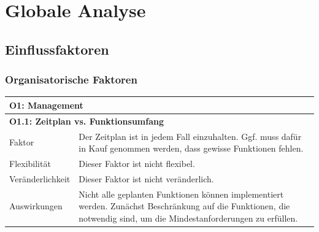 \documentclass[fontsize=12pt,paper=a4,twoside]{scrartcl}
\begin{document}
\section{Globale Analyse}
\label{sec:globale_analyse}

\subsection{Einflussfaktoren}
\label{sec:einflussfaktoren}

\subsubsection{Organisatorische Faktoren}
\begin{tabularx}{\textwidth}{|l|X|}
\hline
\multicolumn{2}{|l|}{\textbf{O1: Management}}\\\hline
\multicolumn{2}{|l|}{\textbf{O1.1: Zeitplan vs. Funktionsumfang}}\\\hline
 Faktor & Der Zeitplan ist in jedem Fall einzuhalten. Ggf. muss dafür in Kauf genommen werden, dass gewisse Funktionen fehlen. \\\hline
 Flexibilität & Dieser Faktor ist nicht flexibel.\\\hline
 Veränderlichkeit & Dieser Faktor ist nicht veränderlich.\\\hline
 Auswirkungen & Nicht alle geplanten Funktionen können implementiert werden. Zunächst Beschränkung auf die Funktionen, die notwendig sind, um die Mindestanforderungen zu erfüllen.\\\hline
\end{tabularx}

\newpage
\end{document}
